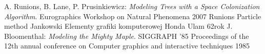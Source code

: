 \documentclass[a4paper,12pt]{report}
\begin{document}








\begin{thebibliography}{1}
 A. Runions, B. Lane, P. Prusinkiewicz: \emph{Modeling Trees with a Space Colonization Algorithm}.
Eurographics Workshop on Natural Phenomena 2007
 Runions Particle method
 Jankowski  Elementy grafiki komputerowej
 Honda
 Ulam 62rok
J. Bloomenthal: \emph{Modeling the Mighty Maple}. SIGGRAPH '85 Proceedings of the 12th annual conference on Computer graphics and interactive techniques 1985
\end{thebibliography}
\end{document}
